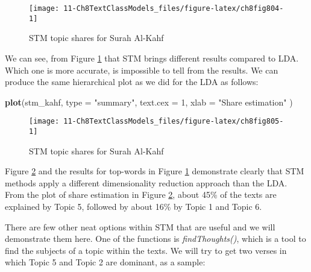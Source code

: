 \documentclass[
]{article}
\newenvironment{Shaded}{\begin{snugshade}}{\end{snugshade}}
\newcommand{\AttributeTok}[1]{\textcolor[rgb]{0.13,0.29,0.53}{#1}}
\newcommand{\DecValTok}[1]{\textcolor[rgb]{0.00,0.00,0.81}{#1}}
\newcommand{\FunctionTok}[1]{\textcolor[rgb]{0.13,0.29,0.53}{\textbf{#1}}}
\newcommand{\NormalTok}[1]{#1}
\newcommand{\StringTok}[1]{\textcolor[rgb]{0.31,0.60,0.02}{#1}}
\begin{document}
\begin{figure}

{\centering \texttt{[image: 11-Ch8TextClassModels\_files/figure-latex/ch8fig804-1]} 

}

\caption{STM topic shares for Surah Al-Kahf}\label{fig:ch8fig804}
\end{figure}

We can see, from Figure \ref{fig:ch8fig804} that STM brings different results compared to LDA. Which one is more accurate, is impossible to tell from the results. We can produce the same hierarchical plot as we did for the LDA as follows:

\begin{Shaded}
\begin{Highlighting}[]
\FunctionTok{plot}\NormalTok{(stm\_kahf, }\AttributeTok{type =} \StringTok{"summary"}\NormalTok{, }\AttributeTok{text.cex =} \DecValTok{1}\NormalTok{,}
  \AttributeTok{xlab =} \StringTok{"Share estimation"}
\NormalTok{)}
\end{Highlighting}
\end{Shaded}

\begin{figure}

{\centering \texttt{[image: 11-Ch8TextClassModels\_files/figure-latex/ch8fig805-1]} 

}

\caption{STM topic shares for Surah Al-Kahf}\label{fig:ch8fig805}
\end{figure}

Figure \ref{fig:ch8fig805} and the results for top-words in Figure \ref{fig:ch8fig804} demonstrate clearly that STM methods apply a different dimensionality reduction approach than the LDA. From the plot of share estimation in Figure \ref{fig:ch8fig805}, about 45\% of the texts are explained by Topic 5, followed by about 16\% by Topic 1 and Topic 6.

There are few other neat options within STM that are useful and we will demonstrate them here. One of the functions is \emph{findThoughts()}, which is a tool to find the subjects of a topic within the texts. We will try to get two verses in which Topic 5 and Topic 2 are dominant, as a sample:
\end{document}
